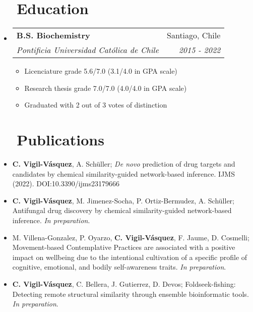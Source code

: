 \documentclass[letter,20pt]{article}
\makeatletter
\newcommand{\resumeItemWithoutTitle}[1]{
  \item\small{
    {\vspace{-2pt}}
  }
}
\newcommand{\resumeSubheading}[4]{
  \vspace{-1pt}\item
    \begin{tabular*}{0.97\textwidth}{l@{\extracolsep{\fill}}r}
      \textbf{#1} & #2 \\
      \textit{#3} & \textit{#4} \\
    \end{tabular*}\vspace{-5pt}
}
\newcommand{\resumeSubHeadingListStart}{\begin{itemize}[leftmargin=*]}
\newcommand{\resumeSubHeadingListEnd}{\end{itemize}}
\makeatother
\begin{document}
\section{~~Education}
\resumeSubHeadingListStart
\resumeSubheading
{B.S. Biochemistry}{Santiago, Chile}
{Pontificia Universidad Católica de Chile}{2015 - 2022}
\vspace{3pt}
\small{
	\begin{multicols}{2}
		\begin{itemize}
			\item Licenciature grade 5.6/7.0 (3.1/4.0 in GPA scale)
			\item Research thesis grade 7.0/7.0 (4.0/4.0 in GPA scale)
			\item Graduated with 2 out of 3 votes of distinction
		\end{itemize}
	\end{multicols}
	}
\resumeSubHeadingListEnd
\vspace{-15pt}
\section{~~Publications}
\resumeSubHeadingListStart
\vspace{2pt}
\resumeItemWithoutTitle{}{\textbf{C. Vigil-Vásquez}, A. Schüller; \textit{De novo} prediction of drug targets and candidates by chemical similarity-guided network-based inference. IJMS (2022). DOI:10.3390/ijms23179666}
\resumeItemWithoutTitle{}{\textbf{C. Vigil-Vásquez}, M. Jimenez-Socha, P. Ortiz-Bermudez, A. Schüller; Antifungal drug discovery by chemical similarity-guided network-based inference. \textit{In preparation}}.
\resumeItemWithoutTitle{}{M. Villena-Gonzalez, P. Oyarzo, \textbf{C. Vigil-Vásquez}, F. Jaume, D. Cosmelli; Movement-based Contemplative Practices are associated with a positive impact on wellbeing due to the intentional cultivation of a specific profile of cognitive, emotional, and bodily self-awareness traits. \textit{In preparation}}.
\resumeItemWithoutTitle{}{\textbf{C. Vigil-Vásquez}, C. Bellera, J. Gutierrez, D. Devos; Foldseek-fishing: Detecting remote structural similarity through ensemble bioinformatic tools. \textit{In preparation}}.
\resumeSubHeadingListEnd
\end{document}
